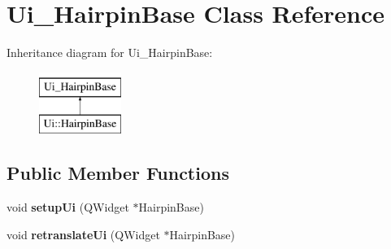 \hypertarget{class_ui___hairpin_base}{}\section{Ui\+\_\+\+Hairpin\+Base Class Reference}
\label{class_ui___hairpin_base}
Inheritance diagram for Ui\+\_\+\+Hairpin\+Base\+:\begin{figure}[H]
\begin{center}
\leavevmode
\includegraphics[height=2.000000cm]{class_ui___hairpin_base}
\end{center}
\end{figure}
\subsection*{Public Member Functions}
\begin{DoxyCompactItemize}
\item 
\mbox{\label{class_ui___hairpin_base_a3839aa28e49f76f8c3dd08b3abe23f8a}} 
void {\bfseries setup\+Ui} (Q\+Widget $\ast$Hairpin\+Base)
\item 
\mbox{\label{class_ui___hairpin_base_a9996f517ff752f9ca1ee9efaa63f16e7}} 
void {\bfseries retranslate\+Ui} (Q\+Widget $\ast$Hairpin\+Base)
\end{DoxyCompactItemize}
